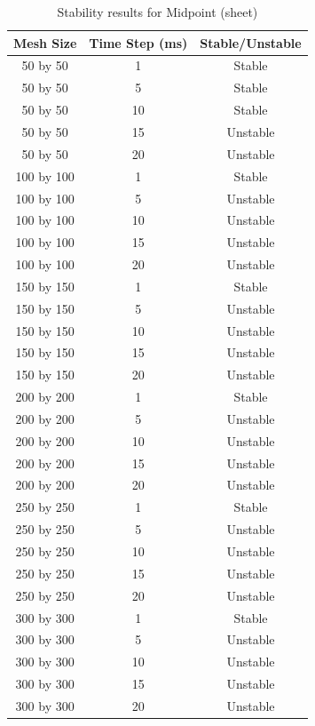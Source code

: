\begin{table}[tp]
   \begin{minipage}{\textwidth}
      \begin{center}
         \begin{tabular}{c|c|c}
           Mesh Size & Time Step (ms) & Stable/Unstable\\
           \hline
           50 by 50 & 1 & Stable\\
           50 by 50 & 5 & Stable\\
           50 by 50 & 10 & Stable\\
           50 by 50 & 15 & Unstable\\
           50 by 50 & 20 & Unstable\\
           100 by 100 & 1 & Stable\\
           100 by 100 & 5 & Unstable\\
           100 by 100 & 10 & Unstable\\
           100 by 100 & 15 & Unstable\\
           100 by 100 & 20 & Unstable\\           
           150 by 150 & 1 & Stable\\
           150 by 150 & 5 & Unstable\\
           150 by 150 & 10 & Unstable\\
           150 by 150 & 15 & Unstable\\
           150 by 150 & 20 & Unstable\\           
           200 by 200 & 1 & Stable\\
           200 by 200 & 5 & Unstable\\
           200 by 200 & 10 & Unstable\\
           200 by 200 & 15 & Unstable\\
           200 by 200 & 20 & Unstable\\           
           250 by 250 & 1 & Stable\\
           250 by 250 & 5 & Unstable\\
           250 by 250 & 10 & Unstable\\
           250 by 250 & 15 & Unstable\\
           250 by 250 & 20 & Unstable\\           
           300 by 300 & 1 & Stable\\
           300 by 300 & 5 & Unstable\\
           300 by 300 & 10 & Unstable\\
           300 by 300 & 15 & Unstable\\
           300 by 300 & 20 & Unstable\\
         \end{tabular}
      \end{center}
   \end{minipage}
   \caption{Stability results for Midpoint (sheet)}
   \label{tab:m stability sheet}
\end{table}

